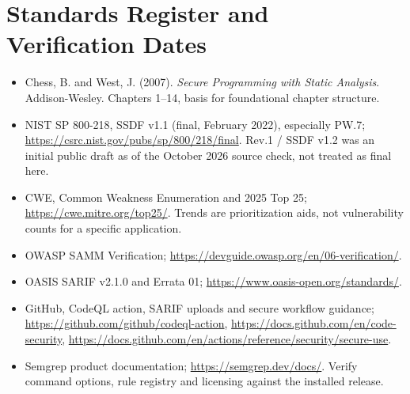 \documentclass[10pt,letterpaper]{article}
\begin{document}
\section{Standards Register and Verification Dates}
\begin{itemize}
\item Chess, B. and West, J. (2007). \emph{Secure Programming with Static Analysis}. Addison-Wesley. Chapters 1--14, basis for foundational chapter structure.
\item NIST SP 800-218, SSDF v1.1 (final, February 2022), especially PW.7; \url{https://csrc.nist.gov/pubs/sp/800/218/final}. Rev.1 / SSDF v1.2 was an initial public draft as of the October 2026 source check, not treated as final here.
\item CWE, Common Weakness Enumeration and 2025 Top 25; \url{https://cwe.mitre.org/top25/}. Trends are prioritization aids, not vulnerability counts for a specific application.
\item OWASP SAMM Verification; \url{https://devguide.owasp.org/en/06-verification/}.
\item OASIS SARIF v2.1.0 and Errata 01; \url{https://www.oasis-open.org/standards/}.
\item GitHub, CodeQL action, SARIF uploads and secure workflow guidance; \url{https://github.com/github/codeql-action}, \url{https://docs.github.com/en/code-security}, \url{https://docs.github.com/en/actions/reference/security/secure-use}.
\item Semgrep product documentation; \url{https://semgrep.dev/docs/}. Verify command options, rule registry and licensing against the installed release.
\end{itemize}
\end{document}
